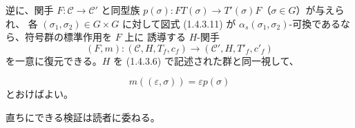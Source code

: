 逆に、関手 $F\colon\mathcal C\to\mathcal C'$ と同型族
$p(\sigma)\colon FT(\sigma)\to T'(\sigma)F$（$\sigma\in G$）が与えられ、
各 $(\sigma_1,\sigma_2)\in G\times G$ に対して図式 (1.4.3.11) が
$\alpha_s(\sigma_1,\sigma_2)$-可換であるなら、符号群の標準作用を $F$ 上に
誘導する $H$-関手
\[
  (F,m)\colon(\mathcal C,H,T_f,c_f)
  \longrightarrow(\mathcal C',H,T'_f,c'_f)
\]
を一意に復元できる。$H$ を (1.4.3.6) で記述された群と同一視して、

\begin{equation}
  m((\varepsilon,\sigma))=\varepsilon p(\sigma)
  \tag{1.4.3.12}
\end{equation}
とおけばよい。

直ちにできる検証は読者に委ねる。
